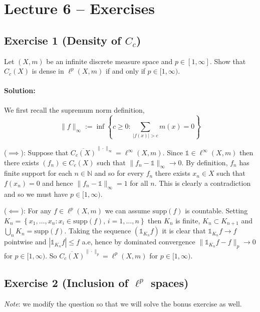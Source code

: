 \section{Lecture 6 -- Exercises}

\subsection{Exercise 1 (Density of \texorpdfstring{$C_{c}$}{})}
Let $(X,m)$ be an infinite discrete measure space and $p\in[1,\infty]$. Show that $C_{c}(X)$ is dense in $\ell^{p}(X,m)$ if and only if $p\in[1,\infty)$.

\paragraph{Solution:}
We first recall the supremum norm definition,
\begin{equation*}
	\|f\|_{\infty}:=\inf\left\{c\geq 0 \colon \sum_{|f(x)|>c}m(x)=0\right\}
\end{equation*}

($\implies$): Suppose that $\overline{C_{c}(X)}^{\|\cdot\|_{\infty}}=\ell^{\infty}(X,m)$. Since $\mathds{1}\in\ell^{\infty}(X,m)$ then there exists $(f_{n})\in C_{c}(X)$ such that $\|f_{n}-\mathds{1}\|_{\infty}\to 0$. By definition, $f_{n}$ has finite support for each $n\in\mathbb{N}$ and so for every $f_{n}$ there exists $x_{n}\in X$ such that $f(x_{n})=0$ and hence $\|f_{n}-\mathds{1}\|_{\infty}=1$ for all $n$. This is clearly a contradiction and so we must have $p\in[1,\infty)$.

($\impliedby$): For any $f\in\ell^{p}(X,m)$ we can assume $\text{supp}(f)$ is countable. Setting $K_{n}=\left\{x_{1},\ldots,x_{n}\colon x_{i}\in \text{supp}(f),\, i=1,\ldots,n\right\}$ then $K_{n}$ is finite, $K_{n}\subset K_{n+1}$ and $\bigcup_{n}K_{n}=\text{supp}(f)$. Taking the sequence $(\mathds{1}_{K_{n}}f)$ it is clear that $\mathds{1}_{K_{n}}f\to f$ pointwise and $|\mathds{1}_{K_{n}}f|\leq f$ a.e, hence by dominated convergence $\|\mathds{1}_{K_{n}}f - f\|_{p}\to 0$ for $p\in[1,\infty)$. So $\overline{C_{c}(X)}^{\|\cdot\|_{p}}=\ell^{p}(X,m)$ for $p\in[1,\infty)$.

\subsection{Exercise 2 (Inclusion of \texorpdfstring{$\ell^{p}$}{} spaces)}
\emph{Note}: we modify the question so that we will solve the bonus exercise as well.


